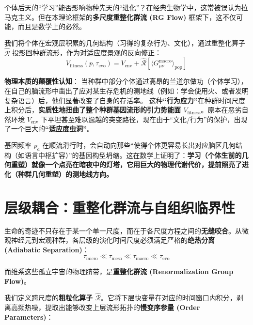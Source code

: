 
个体后天的“学习”能否影响物种先天的“进化”？在经典生物学中，这常被误认为拉马克主义。但在本理论框架的\textbf{多尺度重整化群流 (RG Flow)} 框架下，这不仅可能，而且是数学上的必然。

我们将个体在宏观层积累的几何结构（习得的复杂行为、文化），通过重整化算子 $\hat{\mathcal{R}}$ 投影回种群流形，作为对适应度景观的反向修正：
\begin{equation}
    V_{\text{fitness}}(p, \tau_{\text{evo}}) = V_{\text{env}} + \hat{\mathcal{R}} \left[ \langle G_{\mu\nu}^{\text{macro}} \rangle_{\text{pop}} \right]
\end{equation}

\textbf{物理本质的颠覆性认知}：
当种群中部分个体通过高昂的兰道尔做功（个体学习），在自己的脑流形中凿出了应对某生存危机的测地线（例如：学会使用火、或者发明复杂语言）后，他们显著改变了自身的存活率。
这种\textbf{“行为应力”}在种群时间尺度上积分后，\textbf{实质性地扭曲了整个种群基因流形的引力势能面 $V_{\text{fitness}}$}。原本在恶劣自然环境 $V_{\text{env}}$ 下平坦甚至难以逾越的突变路径，现在由于“文化/行为”的保护，出现了一个巨大的\textbf{“适应度虫洞”}。

基因频率 $p_a$ 在顺流滑行时，会自动向那些“使得个体更容易长出对应脑区几何结构（如语言中枢扩容）”的基因构型坍缩。这在数学上证明了：\textbf{学习（个体生前的几何重塑）就像一个点亮在暗夜中的灯塔，它用巨大的物理代谢代价，提前照亮了进化（种群几何重塑）的测地线方向。}

\section{层级耦合：重整化群流与自组织临界性}
\label{sec:hierarchical_coupling_rg_flow}

生命的奇迹不只存在于某一个单一尺度，而在于各尺度方程之间的\textbf{无缝咬合}。从微观神经元到宏观种群，各层级的演化时间尺度必须满足严格的\textbf{绝热分离 (Adiabatic Separation)}：
\begin{equation}
    \tau_{\text{micro}} \ll \tau_{\text{meso}} \ll \tau_{\text{macro}} \ll \tau_{\text{evo}}
\end{equation}

而维系这些孤立宇宙的物理脐带，是\textbf{重整化群流 (Renormalization Group Flow)}。


我们定义跨尺度的\textbf{粗粒化算子 $\hat{\mathcal{R}}$}。它将下层快变量在对应的时间窗口内积分，剥离高频热噪，提取出能够改变上层流形拓扑的\textbf{慢变序参量 (Order Parameters)}：

